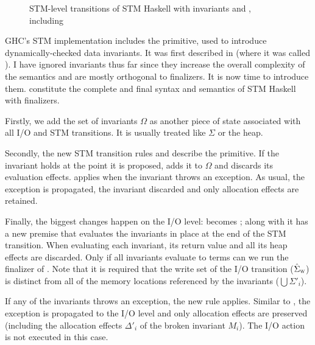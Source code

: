 \begin{figure}

\caption{STM-level transitions of STM Haskell with invariants and , including }
\label{fig:final-stm}
\end{figure}

GHC's STM implementation includes the  primitive, used to introduce dynamically-checked data invariants.
It was first described in \textcite{harris-peytonjones-2006} (where it was called ).
I have ignored invariants thus far since they increase the overall complexity of the semantics and are mostly orthogonal to finalizers.
It is now time to introduce them.
 constitute the complete and final syntax and semantics of STM Haskell with finalizers.

Firstly, we add the set of invariants $\Omega$ as another piece of state associated with all I/O and STM transitions.
It is usually treated like $\Sigma$ or the heap.

Secondly, the new STM transition rules  and  describe the  primitive.
If the invariant holds at the point it is proposed,  adds it to $\Omega$ and discards its evaluation effects.
 applies when the invariant throws an exception.
As usual, the exception is propagated, the invariant discarded and only allocation effects are retained.

Finally, the biggest changes happen on the I/O level:
 becomes ;
along with  it has a new premise that evaluates the invariants in place at the end of the STM transition.
When evaluating each invariant, its return value and all its heap effects are discarded.
Only if all invariants evaluate to  terms can we run the finalizer of .
Note that it is required that the write set of the I/O transition ($\hat{\Sigma}_\textsc{w}$) is distinct from all of the memory locations referenced by the invariants ($\bigcup\Sigma'_i$).

If any of the invariants throws an exception, the new rule  applies.
Similar to , the exception is propagated to the I/O level and only allocation effects are preserved (including the allocation effects $\Delta'_i$ of the broken invariant $M_i$).
The I/O action is not executed in this case.
